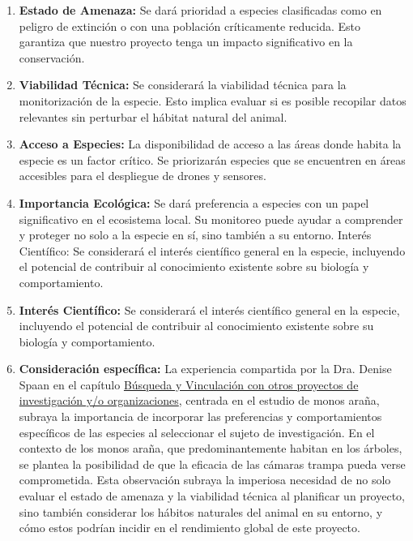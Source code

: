 \begin{enumerate}

\item \textbf{Estado de Amenaza:} Se dará prioridad a especies clasificadas como en peligro de extinción o con una población críticamente reducida. Esto garantiza que nuestro proyecto tenga un impacto significativo en la conservación.

\item \textbf{Viabilidad Técnica:} Se considerará la viabilidad técnica para la monitorización de la especie. Esto implica evaluar si es posible recopilar datos relevantes sin perturbar el hábitat natural del animal.

\item \textbf{Acceso a Especies:} La disponibilidad de acceso a las áreas donde habita la especie es un factor crítico. Se priorizarán especies que se encuentren en áreas accesibles para el despliegue de drones y sensores.

\item \textbf{Importancia Ecológica:} Se dará preferencia a especies con un papel significativo en el ecosistema local. Su monitoreo puede ayudar a comprender y proteger no solo a la especie en sí, sino también a su entorno.
Interés Científico: Se considerará el interés científico general en la especie, incluyendo el potencial de contribuir al conocimiento existente sobre su biología y comportamiento.

\item \textbf{Interés Científico:} Se considerará el interés científico general en la especie, incluyendo el potencial de contribuir al conocimiento existente sobre su biología y comportamiento.
\item \textbf{Consideración específica:} La experiencia compartida por la Dra. Denise Spaan en el capítulo \hyperref[busqueda]{Búsqueda y Vinculación con otros proyectos de investigación y/o organizaciones}, centrada en el estudio de monos araña, subraya la importancia de incorporar las preferencias y comportamientos específicos de las especies al seleccionar el sujeto de investigación. En el contexto de los monos araña, que predominantemente habitan en los árboles, se plantea la posibilidad de que la eficacia de las cámaras trampa pueda verse comprometida. Esta observación subraya la imperiosa necesidad de no solo evaluar el estado de amenaza y la viabilidad técnica al planificar un proyecto, sino también considerar los hábitos naturales del animal en su entorno, y cómo estos podrían incidir en el rendimiento global de este proyecto.
\end{enumerate}

